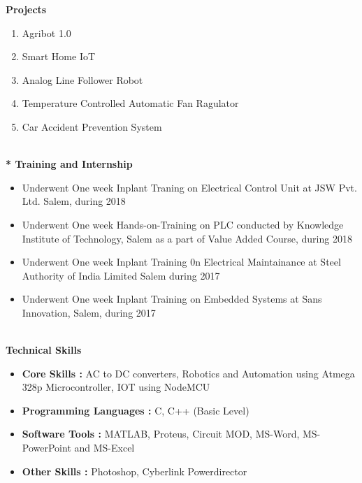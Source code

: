 \documentclass{article}
\begin{document}
	\Large \textbf{Projects}
\begin{enumerate}
	\item Agribot 1.0
	\item Smart Home IoT
	\item Analog Line Follower Robot
	\item Temperature Controlled Automatic Fan Ragulator
	\item Car Accident Prevention System
\end{enumerate}

\Large \textbf{\\* Training and Internship}\

\begin{itemize}
	\item Underwent One week Inplant Traning on Electrical Control Unit at JSW Pvt. Ltd. Salem, during 2018
	\item Underwent One week Hands-on-Training on PLC conducted by Knowledge Institute of Technology, Salem as a part of Value Added Course, during 2018 
	\item Underwent One week Inplant Training 0n Electrical Maintainance at Steel Authority of India Limited Salem during 2017
	\item Underwent One week Inplant Training on Embedded Systems at Sans Innovation, Salem, during 2017 
\end{itemize}

\Large \textbf{\\Technical Skills}\
\begin{itemize}
	\item \textbf{Core Skills	:} AC to DC converters,	Robotics and Automation using Atmega 328p Microcontroller, IOT using NodeMCU
	\item \textbf{Programming Languages	:}	C, C++ (Basic Level)
	\item \textbf{Software Tools	:}	MATLAB, Proteus, Circuit MOD, MS-Word, MS-PowerPoint and MS-Excel
	\item \textbf{Other Skills	:} Photoshop, Cyberlink Powerdirector
\end{itemize}
\end{document}
